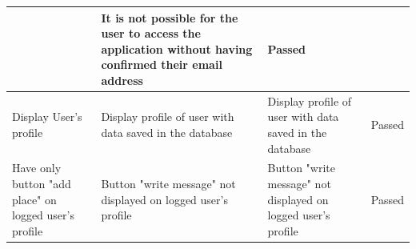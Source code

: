 \documentclass[paper=a4, fontsize=12pt,DIV=14]{scrartcl}    %
\begin{document}
\begin{tabular}{|p{4.3cm}|p{4.3cm}|p{4.3cm}|p{2cm}|}
                & It is not possible for the user to access the application without having confirmed their email address
                & Passed\\
                \hline
                Display User's profile
                & Display profile of user with data saved in the database
                & Display profile of user with data saved in the database
                & Passed\\
                \hline
                Have only button "add place" on logged user's profile
                & Button "write message" not displayed on logged user's profile
                & Button "write message" not displayed on logged user's profile
                & Passed\\
                \hline
            \end{tabular}
\end{document}
